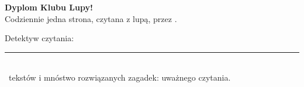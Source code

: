 \begin{center}
\vspace*{2.6cm}

\iconoLupa[0.9]

\vspace{9mm}
{\fontsize{32}{38}\selectfont\bfseries\color{colorLectura} Dyplom Klubu Lupy!}\\[8mm]
{\Large Codziennie jedna strona, czytana z lupą, przez .}\\[10mm]
{\Large Detektyw czytania: \rule{65mm}{0.4pt}}\\[14mm]
{\large \totaldias\ tekstów i mnóstwo rozwiązanych zagadek:  uważnego czytania.}
\end{center}
\vspace*{\fill}
\newpage
